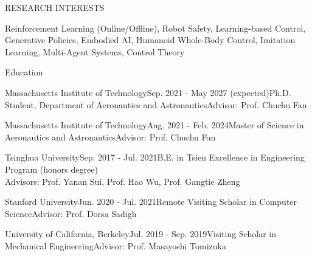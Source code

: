 \documentclass{resume} %
\begin{document}
	\begin{rSection}{RESEARCH INTERESTS}
		\raggedright
		Reinforcement Learning (Online/Offline), Robot Safety, Learning-based Control, Generative Policies, Embodied AI, Humanoid Whole-Body Control, Imitation Learning, Multi-Agent Systems, Control Theory
	\end{rSection}

	\begin{rSection}{Education} 		
		\begin{rSubsection2}{Massachusetts Institute of Technology}{Sep. 2021 - May 2027 (expected)}{Ph.D. Student, Department of Aeronautics and Astronautics}{Advisor: Prof. Chuchu Fan}
		\end{rSubsection2}

		\begin{rSubsection2}{Massachusetts Institute of Technology}{Aug. 2021 - Feb. 2024}{Master of Science in Aeronautics and Astronautics}{Advisor: Prof. Chuchu Fan}
		\end{rSubsection2} 
	
		\begin{rSubsection2}{Tsinghua University}{Sep. 2017 - Jul. 2021}{B.E. in Tsien Excellence in Engineering Program (honors degree)}{\\\hspace*{\fill}Advisors: Prof. Yanan Sui, Prof. Hao Wu, Prof. Gangtie Zheng}
		\end{rSubsection2}
        
        \begin{rSubsection2}{Stanford University}{Jun. 2020 - Jul. 2021}{Remote Visiting Scholar in Computer Science}{Advisor: Prof. Dorsa Sadigh}
		\end{rSubsection2}

		\begin{rSubsection2}{University of California, Berkeley}{Jul. 2019 - Sep. 2019}{Visiting Scholar in Mechanical Engineering}{Advisor: Prof. Masayoshi Tomizuka}
		\end{rSubsection2}
	\end{rSection}
\end{document}
